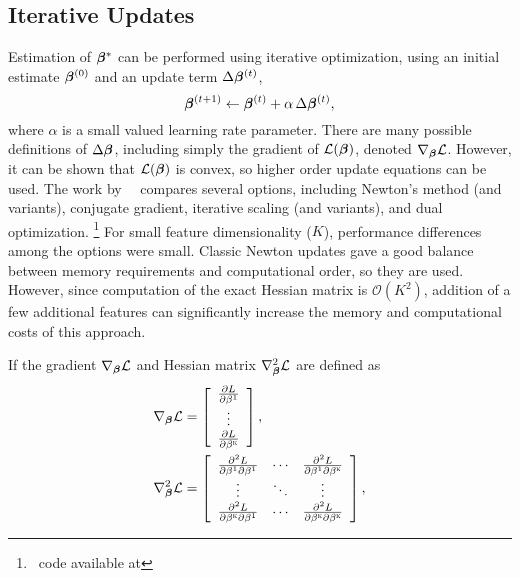\subsection{Iterative Updates}
Estimation of $\bm{\beta}^*$ can be performed using iterative optimization,
using an initial estimate $\bm{\beta}^{(0)}$ and an update term $\Delta\bm{\beta}^{(t)}$,
\begin{equation}
  \bb^{(t+1)} \leftarrow \bb^{(t)} + \alpha\thinspace\Delta\bb^{(t)},%
  \label{eq:update}
\end{equation}
where $\alpha$ is a small valued learning rate parameter.
There are many possible definitions of $\Delta\bm{\beta}$,
including simply the gradient of $\mathcal{L}(\bm{\beta})$, denoted $\nabla_{\bm{\beta}}\mathcal{L}$.
However, it can be shown that $\mathcal{L}(\bm{\beta})$ is convex, so higher order update equations can be used.
The work by~\citeauthor{Minka2003}~\cite{Minka2003} compares several options,
including Newton's method (and variants),
conjugate gradient, iterative scaling (and variants), and dual optimization.%
\footnote{\matlab\ code available at }
For small feature dimensionality ($K$), performance differences among the options were small.
Classic Newton updates gave a good balance between memory requirements and computational order,
so they are used.
However, since computation of the exact Hessian matrix is $\mathcal{O}(K^2)$,
addition of a few additional features can significantly increase the memory and computational
costs of this approach.
\par
If the gradient $\nabla_{\bm{\beta}}\mathcal{L}$ and Hessian matrix $\nabla^2_{\bm{\beta}}\mathcal{L}$ are defined as
\begin{align}
  \nabla_{\bb}\L   &= \left[\begin{array}{c}
                        \frac{\d L}{\d\b^1}\\\vdots\\\frac{\d L}{\d\b^\sk}
                      \end{array}\right],%
  \label{eq:llgradient0}\\
  \nabla^2_{\bb}\L &= \left[\begin{array}{ccc}
                        \frac{\d^2 L}{\d\b^1\d\b^1}   & \cdots & \frac{\d^2 L}{\d\b^1\d\b^\sk}\\
                                               \vdots & \ddots & \vdots \\
                        \frac{\d^2 L}{\d\b^\sk\d\b^1} & \cdots & \frac{\d^2 L}{\d\b^\sk\d\b^\sk}
                      \end{array}\right]%
  \label{eq:llhessian0},
\end{align}
